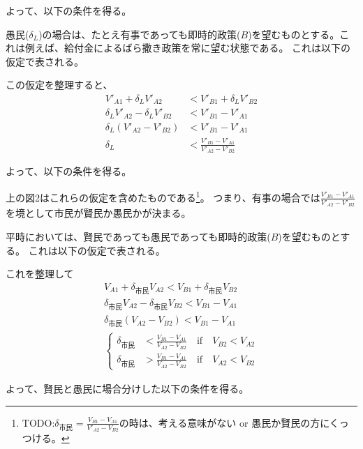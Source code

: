\documentclass[main.tex]{subfiles}
\begin{document}
よって、以下の条件を得る。






\bigskip
愚民($\delta_L$)の場合は、たとえ有事であっても即時的政策($B$)を望むものとする。これは例えば、給付金によるばら撒き政策を常に望む状態である。
これは以下の仮定で表される。
 
この仮定を整理すると、
\begin{align*}
  V'_{A1} + \delta_L V'_{A2} &< V'_{B1} + \delta_L V'_{B2} \\
  \delta_L V'_{A2} - \delta_L V'_{B2} &< V'_{B1}  - V'_{A1} \\
  \delta_L (V'_{A2} - V'_{B2}) &< V'_{B1}  - V'_{A1}\\
  \delta_L &< \frac{V'_{B1}  - V'_{A1}}{V'_{A2} - V'_{B2}}
\end{align*}

よって、以下の条件を得る。

\bigskip
上の図2はこれらの仮定を含めたものである\footnote{TODO:$\delta_{市民} = \frac{V_{B1} - V_{A1}}{V'_{A2} - V_{B2}}$の時は、考える意味がない or 愚民か賢民の方にくっつける。}。
つまり、有事の場合では$\frac{V'_{B1} - V'_{A1}}{V'_{A2} - V'_{B2}}$を境として市民が賢民か愚民かが決まる。 


平時においては、賢民であっても愚民であっても即時的政策($B$)を望むものとする。
これは以下の仮定で表される。

これを整理して
\begin{align*}
  V_{A1} + \delta_{市民} V_{A2} < V_{B1} + \delta_{市民} V_{B2} \\
  \delta_{市民} V_{A2} - \delta_{市民} V_{B2} < V_{B1} - V_{A1} \\
  \delta_{市民} (V_{A2} - V_{B2}) < V_{B1} - V_{A1} \\
  \begin{cases}
    \delta_{市民} &< \frac{V_{B1}-V_{A1}}{V_{A2} - V_{B2}} \quad\text{if}\quad V_{B2} < V_{A2}\\
    \delta_{市民} &> \frac{V_{B1}-V_{A1}}{V_{A2} - V_{B2}} \quad\text{if}\quad V_{A2} < V_{B2}
  \end{cases}
\end{align*}

よって、賢民と愚民に場合分けした以下の条件を得る。
\end{document}
